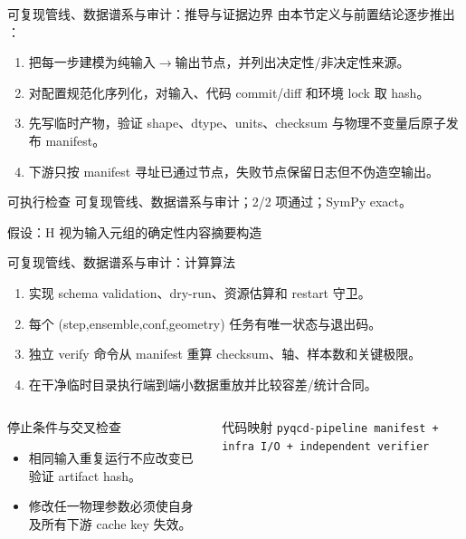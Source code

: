 \begin{frame}[t]{可复现管线、数据谱系与审计：推导与证据边界}
\footnotesize
{}\quad 由本节定义与前置结论逐步推出 ：
\begin{enumerate}
\item 把每一步建模为纯输入\ensuremath{\rightarrow}输出节点，并列出决定性/\allowbreak{}非决定性来源。
\item 对配置规范化序列化，对输入、代码 commit/\allowbreak{}diff 和环境 lock 取 hash。
\item 先写临时产物，验证 shape、dtype、units、checksum 与物理不变量后原子发布 manifest。
\item 下游只按 manifest 寻址已通过节点，失败节点保留日志但不伪造空输出。
\end{enumerate}\begin{block}{可执行检查}
\quad 可复现管线、数据谱系与审计；2/2 项通过；SymPy exact。
\par\scriptsize 假设：H 视为输入元组的确定性内容摘要构造
\end{block}
\end{frame}

\begin{frame}[t]{可复现管线、数据谱系与审计：计算算法}
\footnotesize
{}\begin{enumerate}
\item 实现 schema validation、dry-run、资源估算和 restart 守卫。
\item 每个 (step,ensemble,conf,geometry) 任务有唯一状态与退出码。
\item 独立 verify 命令从 manifest 重算 checksum、轴、样本数和关键极限。
\item 在干净临时目录执行端到端小数据重放并比较容差/\allowbreak{}统计合同。
\end{enumerate}\begin{columns}[T,onlytextwidth]
\begin{block}{停止条件与交叉检查}\scriptsize\begin{itemize}
\item[\CheckMark] 相同输入重复运行不应改变已验证 artifact hash。
\item[\CheckMark] 修改任一物理参数必须使自身及所有下游 cache key 失效。
\end{itemize}\end{block}
\begin{block}{代码映射}
\scriptsize \texttt{pyqcd-pipeline manifest + infra I/\allowbreak{}O + independent verifier}
\end{block}\end{columns}\end{frame}


